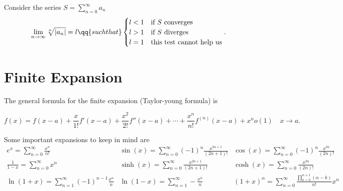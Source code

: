 \begin{theorem}
	Consider the series $S=\sum_{n=0}^{\infty} a_n$
	\[
		\lim_{n \to \infty}\sqrt[n]{|a_n|} = l\qq{such that} \begin{cases}l<1 & \text{if $S$ converges}         \\
			l>1 & \text{if $S$ diverges}          \\
			l=1 & \text{this test cannot help us} \\
		\end{cases}
		.\]
\end{theorem}
\section{Finite Expansion}
The general formula for the finite expansion (Taylor-young formula) is

\[
	f(x) = f(x-a)+ \frac{x}{1!}f'(x-a)+\frac{x^2}{2!}f''(x-a)+\cdots+\frac{x^n}{n!}f^{(n)}(x-a)+x^no(1) \quad x\to a
	.\]

Some important expansions to keep in mind are
\[\renewcommand{\arraystretch}{2.5}
	\begin{array}{l|l|l}
		e^x=\sum_{n=0}^{\infty} \frac{x^n}{n!}\quad          & \sin(x)=\sum_{n=0}^{\infty} (-1)^n \frac{x^{2n+1}}{(2n+1)!} & \cos(x)=\sum_{n=0}^{\infty} (-1)^n \frac{x^{2n}}{(2n)!}                      \\
		\frac{1}{1-x}=\sum_{n=0}^{\infty} x^n                & \sinh(x)=\sum_{n=0}^{\infty} \frac{x^{2n+1}}{(2n+1)!}       & \cosh(x)=\sum_{n=0}^{\infty} \frac{x^{2n}}{(2n)!}                            \\
		\ln(1+x)=\sum_{n=1}^{\infty} (-1)^{n-1}\frac{x^n}{n} & \ln(1-x)=\sum_{n=1}^{\infty} -\frac{x^n}{n}                 & (1+x)^\alpha=\sum_{n=0}^{\infty} \frac{\prod_{k=0}^{n+1}(\alpha-k)  }{n!}x^n
	\end{array}
\]
